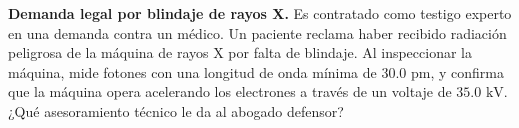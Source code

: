 \item \textbf{Demanda legal por blindaje de rayos X.}
Es contratado como testigo experto en una demanda contra un médico. Un paciente reclama haber recibido radiación peligrosa de la máquina de rayos X por falta de blindaje. Al inspeccionar la máquina, mide fotones con una longitud de onda mínima de $30.0\text{ pm}$, y confirma que la máquina opera acelerando los electrones a través de un voltaje de $35.0\text{ kV}$. ¿Qué asesoramiento técnico le da al abogado defensor?
